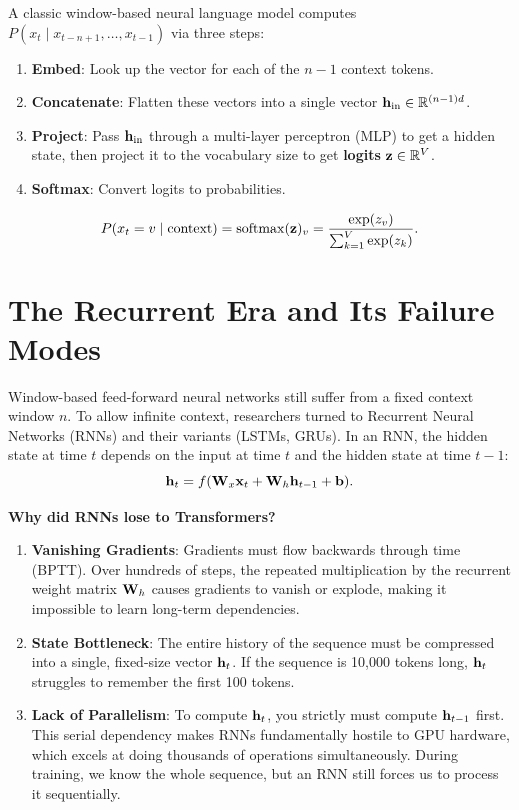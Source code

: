 A classic window-based neural language model computes $P(x_t \mid x_{t-n+1}, \dots, x_{t-1})$ via three steps:
\begin{enumerate}
    \item \textbf{Embed}: Look up the vector for each of the $n-1$ context tokens.
    \item \textbf{Concatenate}: Flatten these vectors into a single vector $\mathbf{h}_{\text{in}} \in \mathbb{R}^{(n-1)d}$.
    \item \textbf{Project}: Pass $\mathbf{h}_{\text{in}}$ through a multi-layer perceptron (MLP) to get a hidden state, then project it to the vocabulary size to get \textbf{logits} $\mathbf{z} \in \mathbb{R}^V$.
    \item \textbf{Softmax}: Convert logits to probabilities.
\end{enumerate}

\begin{equation}
\label{eq:08:softmax}
P(x_t = v \mid \text{context}) = \operatorname{softmax}(\mathbf{z})_v = \frac{\exp(z_v)}{\sum_{k=1}^V \exp(z_k)}.
\end{equation}

\section{The Recurrent Era and Its Failure Modes}

Window-based feed-forward neural networks still suffer from a fixed context window $n$. To allow infinite context, researchers turned to Recurrent Neural Networks (RNNs) and their variants (LSTMs, GRUs). In an RNN, the hidden state at time $t$ depends on the input at time $t$ and the hidden state at time $t-1$:
\begin{equation}
\mathbf{h}_t = f(\mathbf{W}_x \mathbf{x}_t + \mathbf{W}_h \mathbf{h}_{t-1} + \mathbf{b}).
\end{equation}

\textbf{Why did RNNs lose to Transformers?}
\begin{enumerate}
    \item \textbf{Vanishing Gradients}: Gradients must flow backwards through time (BPTT). Over hundreds of steps, the repeated multiplication by the recurrent weight matrix $\mathbf{W}_h$ causes gradients to vanish or explode, making it impossible to learn long-term dependencies.
    \item \textbf{State Bottleneck}: The entire history of the sequence must be compressed into a single, fixed-size vector $\mathbf{h}_t$. If the sequence is 10,000 tokens long, $\mathbf{h}_t$ struggles to remember the first 100 tokens.
    \item \textbf{Lack of Parallelism}: To compute $\mathbf{h}_t$, you strictly must compute $\mathbf{h}_{t-1}$ first. This serial dependency makes RNNs fundamentally hostile to GPU hardware, which excels at doing thousands of operations simultaneously. During training, we know the whole sequence, but an RNN still forces us to process it sequentially.
\end{enumerate}

